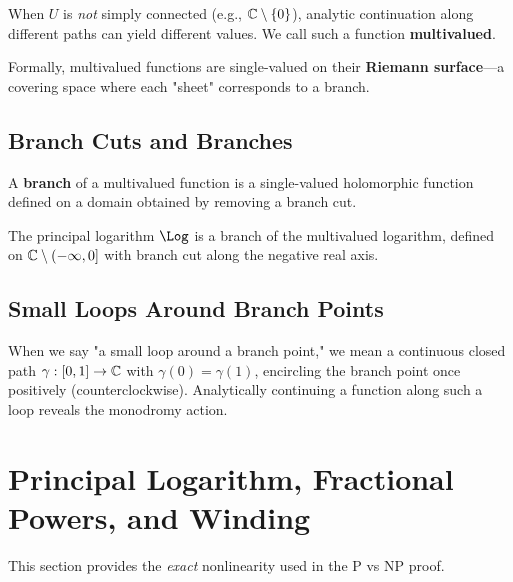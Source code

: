 \begin{remark}
When $U$ is \textit{not} simply connected (e.g., $\mathbb{C} \setminus \{0\}$), analytic continuation along different paths can yield different values. We call such a function \textbf{multivalued}.

Formally, multivalued functions are single-valued on their \textbf{Riemann surface}—a covering space where each "sheet" corresponds to a branch.
\end{remark}

\subsection{Branch Cuts and Branches}

\begin{definition}[Branch]
A \textbf{branch} of a multivalued function is a single-valued holomorphic function defined on a domain obtained by removing a branch cut.
\end{definition}

\begin{example}
The principal logarithm $\Log$ is a branch of the multivalued logarithm, defined on $\mathbb{C} \setminus (-\infty, 0]$ with branch cut along the negative real axis.
\end{example}

\subsection{Small Loops Around Branch Points}

\begin{remark}
When we say "a small loop around a branch point," we mean a continuous closed path $\gamma: [0,1] \to \mathbb{C}$ with $\gamma(0) = \gamma(1)$, encircling the branch point once positively (counterclockwise). Analytically continuing a function along such a loop reveals the monodromy action.
\end{remark}

\section{Principal Logarithm, Fractional Powers, and Winding}
\label{sec:logarithm-fractional-powers}

This section provides the \textit{exact} nonlinearity used in the P vs NP proof.

